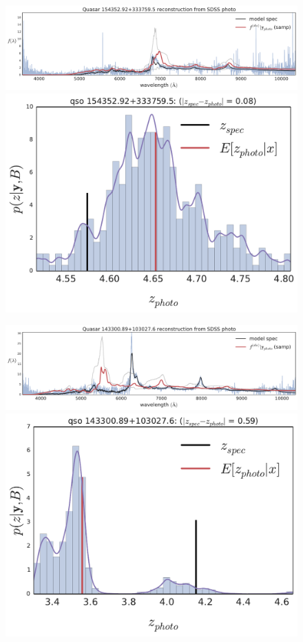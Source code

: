 \documentclass{article} %
\begin{document}
\begin{figure}[t]
\vskip 0in
\centerline{
\includegraphics[width=1.5\halfwidth]{../figs/quasar_plots/quasar_490_mcmc_recon.pdf}
\includegraphics[width=.57\halfwidth]{../figs/quasar_plots/quasar_490_posterior_z}
} 
\centerline{
\includegraphics[width=1.5\halfwidth]{../figs/quasar_plots/quasar_214_mcmc_recon.pdf}
\includegraphics[width=.57\halfwidth]{../figs/quasar_plots/quasar_214_posterior_z}
}
\end{figure}
\end{document}
